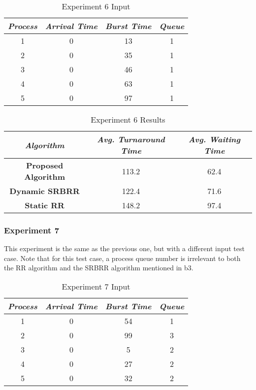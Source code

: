 \documentclass[conference]{IEEEtran}
\newcommand\T{\rule{0pt}{2.6ex}}       %
\newcommand\B{\rule[-1.2ex]{0pt}{0pt}} %
\begin{document}
\begin{table}[H]
    \caption{Experiment 6 Input}
    \centering
     \begin{tabular}{||c c c c||} 
     \hline
     \textit{\textbf{Process}} & \textit{\textbf{Arrival Time}} & \textit{\textbf{Burst Time}} & \textit{\textbf{Queue}} \T \B \\ 
     \hline
     \hline
     1 & 0 & 13 & 1 \T \B \\ 
     \hline
     2 & 0 & 35 & 1 \T \B \\
     \hline
     3 & 0 & 46 & 1 \T \B \\
     \hline
     4 & 0 & 63 & 1 \T \B \\
     \hline
     5 & 0 & 97 & 1 \T \B \\ 
     \hline
     \end{tabular}
\end{table}

\begin{table}[H]
    \caption{Experiment 6 Results}
    \centering
    \begin{tabular}{||c c c||}
        \hline
        \textit{\textbf{Algorithm}} & \textit{\textbf{Avg. Turnaround Time}} & \textit{\textbf{Avg. Waiting Time}}\T \B \\
    \hline
    \hline
    \textbf{Proposed Algorithm} & 113.2 & 62.4 \T \B\\ \hline
    \textbf{Dynamic SRBRR} & 122.4 & 71.6 \T \B\\ \hline
    \textbf{Static RR} & 148.2 & 97.4 \T \B\\ \hline
     \end{tabular}
\end{table}

\subsubsection{Experiment 7}

This experiment is the same as the previous one, but with a different input test case. Note that for this test case, a process queue number is irrelevant to both the RR algorithm and the SRBRR algorithm mentioned in {b3}.

\begin{table}[H]
    \caption{Experiment 7 Input}
    \centering
     \begin{tabular}{||c c c c||} 
     \hline
     \textit{\textbf{Process}} & \textit{\textbf{Arrival Time}} & \textit{\textbf{Burst Time}} & \textit{\textbf{Queue}} \T \B \\ 
     \hline
     \hline
     1 & 0 & 54 & 1 \T \B \\ 
     \hline
     2 & 0 & 99 & 3 \T \B \\
     \hline
     3 & 0 & 5 & 2 \T \B \\
     \hline
     4 & 0 & 27 & 2 \T \B \\
     \hline
     5 & 0 & 32 & 2 \T \B \\ 
     \hline
     \end{tabular}
\end{table}
\end{document}
